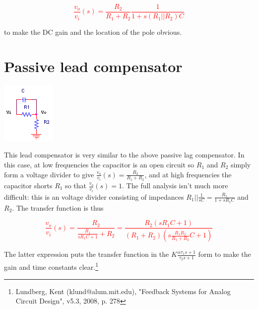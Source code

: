 \textcolor{red}{
\begin{equation}
\frac{v_{o}}{v_{i}}(s) = \frac{R_{2}}{R_{1}+R_{2}}\frac{1}{1+s(R_{1}||R_{2})C}
\end{equation}
}

to make the DC gain and the location of the pole obvious.

\section{Passive lead compensator}
\begin{center}
	\includegraphics{schematics/passivelead.PNG}
\end{center}
This lead compensator is very similar to the above passive lag compensator. In this case, at low frequencies the capacitor is an open circuit so $R_{1}$ and $R_{2}$ simply form a voltage divider to give $\frac{v_{o}}{v_{i}}(s) = \frac{R_{2}}{R_{1}+R_{2}}$, and at high frequencies the capacitor shorts $R_{1}$ so that $\frac{v_{o}}{v_{i}}(s) = 1$. The full analysis isn't much more difficult: this is an voltage divider consisting of impedances $R_{1}||\frac{1}{sC} = \frac{R_{1}}{1+sR_{1}C}$ and $R_{2}$. The transfer function is thus

\textcolor{red}{
\begin{equation}
\frac{v_{o}}{v_{i}}(s) = \frac{R_{2}}{\frac{R_{1}}{sR_{1}C+1} + R_{2}} = \frac{R_{2}(sR_{1}C + 1)}{(R_{1} + R_{2})(s\frac{R_{1}R_{2}}{R_{1}+R_{2}}C + 1)}
\label{eq:passivelead}
\end{equation}
}

The latter expression puts the transfer function in the $K\frac{\alpha \tau_{1}s+1}{\tau_{2}s+1}$ form to make the gain and time constants clear.\footnote{Lundberg, Kent (klund@alum.mit.edu), "Feedback Systems for Analog Circuit Design", v5.3, 2008, p. 278}

